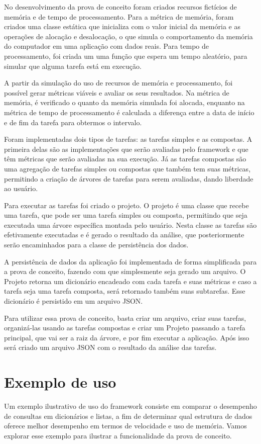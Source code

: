 \documentclass[12pt]{tcc}
\begin{document}
No desenvolvimento da prova de conceito foram criados recursos fictícios de memória e de tempo de processamento. Para a métrica de memória, foram criados uma classe estática que inicializa com o valor inicial da memória e as operações de alocação e desalocação, o que simula o comportamento da memória do computador em uma aplicação com dados reais. Para tempo de processamento, foi criada um uma função que espera um tempo aleatório, para simular que alguma tarefa está em execução.

A partir da simulação do uso de recursos de memória e processamento, foi possível gerar métricas viáveis e avaliar os seus resultados. Na métrica de memória, é verificado o quanto da memória simulada foi alocada, enquanto na métrica de tempo de processamento é calculada a diferença entre a data de início e de fim da tarefa para obtermos o intervalo. 

Foram implementadas dois tipos de tarefas: as tarefas simples e as compostas. A primeira delas são as implementações que serão avaliadas pelo framework e que têm métricas que serão avaliadas na sua execução. Já as tarefas compostas são uma agregação de tarefas simples ou compostas que também tem suas métricas, permitindo a criação de árvores de tarefas para serem avaliadas, dando liberdade ao usuário.

Para executar as tarefas foi criado o projeto. O projeto é uma classe que recebe uma tarefa, que pode ser uma tarefa simples ou composta, permitindo que seja executada uma árvore específica montada pelo usuário. Nesta classe as tarefas são efetivamente executadas e é gerado o resultado da análise, que posteriormente serão encaminhados para a classe de persistência dos dados.

A persistência de dados da aplicação foi implementada de forma simplificada para a prova de conceito, fazendo com que simplesmente seja gerado um arquivo. O Projeto retorna um dicionário encadeado com cada tarefa e suas métricas e caso a tarefa seja uma tarefa composta, será retornado também suas subtarefas. Esse dicionário é persistido em um arquivo JSON. 

Para utilizar essa prova de conceito, basta criar um arquivo, criar suas tarefas, organizá-las usando as tarefas compostas e criar um Projeto passando a tarefa principal, que vai ser a raiz da árvore, e por fim executar a aplicação. Após isso será criado um arquivo JSON com o resultado da análise das tarefas.

\section{Exemplo de uso}
Um exemplo ilustrativo de uso do framework consiste em comparar o desempenho de consultas em dicionários e listas, a fim de determinar qual estrutura de dados oferece melhor desempenho em termos de velocidade e uso de memória. Vamos explorar esse exemplo para ilustrar a funcionalidade da prova de conceito.
\end{document}
